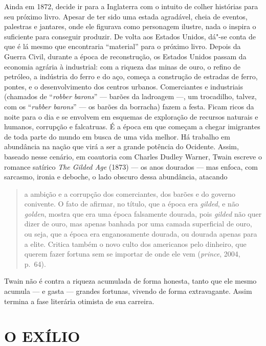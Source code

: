 Ainda em 1872, decide ir para a Inglaterra com o intuito de colher
histórias para seu próximo livro. Apesar de ter sido uma estada agradável,
cheia de eventos, palestras e jantares, onde ele figurava como personagem
ilustre, nada o inspira o suficiente para conseguir produzir. De volta aos
Estados Unidos, dá"-se conta de que é lá mesmo que encontraria
``material'' para o próximo livro. Depois da
Guerra Civil, durante a época de reconstrução, os Estados Unidos passam da
economia agrária à industrial: com a riqueza das minas de ouro, o
refino de petróleo, a indústria do ferro e do aço, começa a construção de
estradas de ferro, pontes, e o desenvolvimento dos centros urbanos.
Comerciantes e industriais (chamados de ``\textit{robber
barons}'' --- barões da ladroagem ---, um trocadilho, talvez, com
os ``\textit{rubber barons}'' --- os barões da borracha)
fazem a festa. Ficam ricos da noite para o dia e se envolvem em
esquemas de exploração de recursos naturais e humanos, corrupção e
falcatruas. É a época em que começam a chegar imigrantes de toda parte do
mundo em busca de uma vida melhor. Há trabalho em abundância na nação que virá a ser a
grande potência do Ocidente. Assim, baseado nesse cenário, em coautoria
com Charles Dudley Warner, Twain escreve o romance satírico \textit{The Gilded Age}
(1873) --- os anos dourados --- mas enfoca, com sarcasmo, ironia e deboche, o
lado obscuro dessa abundância, atacando

\begin{quote}
a ambição e a corrupção dos comerciantes, dos barões e do governo conivente. O fato de
afirmar, no título, que a época era \textit{gilded}, e não \textit{golden}, mostra que
era uma época falsamente dourada, pois \textit{gilded} não quer dizer de ouro, mas apenas
banhada por uma camada superficial de ouro, ou seja, que a época era
enganosamente dourada, ou dourada apenas para a elite. Critica também o
novo culto dos americanos pelo dinheiro, que querem fazer fortuna sem se
importar de onde ele vem (\textit{prince}, 2004, p.~64).
\end{quote}

Twain não é contra a riqueza acumulada de forma honesta, tanto que ele mesmo acumula --- e
gasta --- grandes fortunas, vivendo de forma extravagante. Assim termina
a fase literária otimista de sua carreira.

\section{O EXÍLIO}

